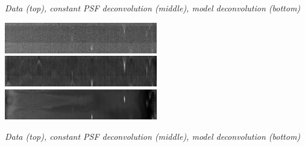 \documentclass[a0paper,portrait,fontscale=0.35]{baposter}
\newcommand{\mycaption}[1]{
  {
    \smaller
    \emph{#1}
  }
}
\theoremstyle{plain}
\theoremstyle{plain}
\theoremstyle{definition}
\theoremstyle{plain}
\theoremstyle{definition}
\begin{document}
\begin{poster}
{\begin{minipage}[t]{0.51\textwidth}
    \begin{center}
      \mycaption{
        Data (top), constant PSF deconvolution (middle),
        model deconvolution (bottom)
      }
    \end{center}

    \begin{minipage}[t]{\textwidth}
      \centering
      \includegraphics[width=0.5\textwidth]{img/fBeads_xz1.png}
      \includegraphics[width=0.5\textwidth]{img/urecBeads_h_xz1.png}
      \includegraphics[width=0.5\textwidth]{img/urecBeads_xz1.png}
    \end{minipage}

    \begin{center}
      \mycaption{
        Data (top), constant PSF deconvolution (middle),
        model deconvolution (bottom)
      }
    \end{center}



\end{minipage}}
\end{poster}
\end{document}
